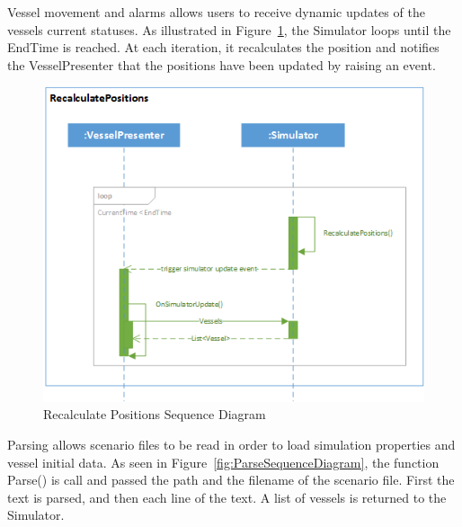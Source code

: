 \documentclass[12pt]{article}
\begin{document}
\par
Vessel movement and alarms allows users to receive dynamic updates of the vessels current statuses. As illustrated in Figure~\ref{fig:RecalculatePositionsSequenceDiagram}, the Simulator loops until the EndTime is reached. At each iteration, it recalculates the position and notifies the VesselPresenter that the positions have been updated by raising an event.
\clearpage

\begin{figure}[h!]
    \centering
    \includegraphics[scale=1]{2_1_recalculate_positions}
    \caption{Recalculate Positions Sequence Diagram}
    \label{fig:RecalculatePositionsSequenceDiagram}
\end{figure}

\par
Parsing allows scenario files to be read in order to load simulation properties and vessel initial data. As seen in Figure~\ref{fig:ParseSequenceDiagram}, the function Parse() is call and passed the path and the filename of the scenario file. First the text is parsed, and then each line of the text. A list of vessels is returned to the Simulator.
\end{document}
